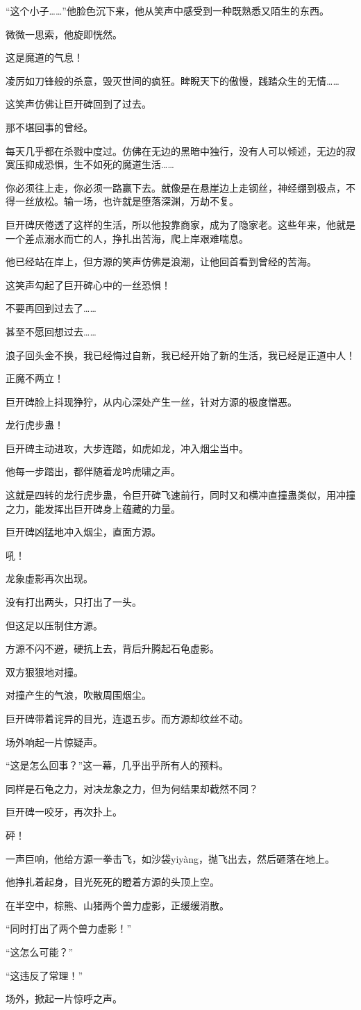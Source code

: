 \begin{this_body}
“这个小子……”他脸色沉下来，他从笑声中感受到一种既熟悉又陌生的东西。

微微一思索，他旋即恍然。

这是魔道的气息！

凌厉如刀锋般的杀意，毁灭世间的疯狂。睥睨天下的傲慢，践踏众生的无情……

这笑声仿佛让巨开碑回到了过去。

那不堪回事的曾经。

每天几乎都在杀戮中度过。仿佛在无边的黑暗中独行，没有人可以倾述，无边的寂寞压抑成恐惧，生不如死的魔道生活……

你必须往上走，你必须一路赢下去。就像是在悬崖边上走钢丝，神经绷到极点，不得一丝放松。输一场，也许就是堕落深渊，万劫不复。

巨开碑厌倦透了这样的生活，所以他投靠商家，成为了隐家老。这些年来，他就是一个差点溺水而亡的人，挣扎出苦海，爬上岸艰难喘息。

他已经站在岸上，但方源的笑声仿佛是浪潮，让他回首看到曾经的苦海。

这笑声勾起了巨开碑心中的一丝恐惧！

不要再回到过去了……

甚至不愿回想过去……

浪子回头金不换，我已经悔过自新，我已经开始了新的生活，我已经是正道中人！

正魔不两立！

巨开碑脸上抖现狰狞，从内心深处产生一丝，针对方源的极度憎恶。

龙行虎步蛊！

巨开碑主动进攻，大步连踏，如虎如龙，冲入烟尘当中。

他每一步踏出，都伴随着龙吟虎啸之声。

这就是四转的龙行虎步蛊，令巨开碑飞速前行，同时又和横冲直撞蛊类似，用冲撞之力，能发挥出巨开碑身上蕴藏的力量。

巨开碑凶猛地冲入烟尘，直面方源。

吼！

龙象虚影再次出现。

没有打出两头，只打出了一头。

但这足以压制住方源。

方源不闪不避，硬抗上去，背后升腾起石龟虚影。

双方狠狠地对撞。

对撞产生的气浪，吹散周围烟尘。

巨开碑带着诧异的目光，连退五步。而方源却纹丝不动。

场外响起一片惊疑声。

“这是怎么回事？”这一幕，几乎出乎所有人的预料。

同样是石龟之力，对决龙象之力，但为何结果却截然不同？

巨开碑一咬牙，再次扑上。

砰！

一声巨响，他给方源一拳击飞，如沙袋yiyàng，抛飞出去，然后砸落在地上。

他挣扎着起身，目光死死的瞪着方源的头顶上空。

在半空中，棕熊、山猪两个兽力虚影，正缓缓消散。

“同时打出了两个兽力虚影！”

“这怎么可能？”

“这违反了常理！”

场外，掀起一片惊呼之声。

\end{this_body}


